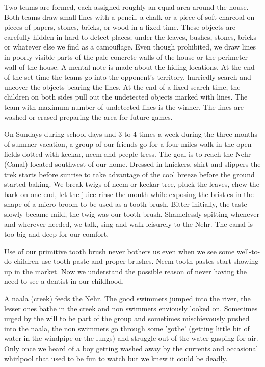 Two teams are formed, each assigned roughly an equal area around the
house. Both teams draw small lines with a pencil, a chalk or a piece of
soft charcoal on pieces of papers, stones, bricks, or wood in a fixed
time. These objects are carefully hidden in hard to detect places; under
the leaves, bushes, stones, bricks or whatever else we find as
a camouflage. Even though prohibited, we draw lines in poorly visible
parts of the pale concrete walls of the house or the perimeter wall of the
house.  A mental note is made about the hiding locations. At the end of
the set time the teams go into the opponent's territory, hurriedly search
and uncover the objects bearing the lines. At the end of a fixed search
time, the children on both sides pull out the undetected objects marked
with lines. The team with maximum number of undetected lines is the
winner. The lines are washed or erased preparing the area for future
games. 

On Sundays during school days and 3 to 4 times a week during the three
months of summer vacation, a group of our friends go for a four miles walk
in the open fields dotted with keekar, neem and peeple tress. The goal is
to reach the Nehr (Canal) located southwest of our home. Dressed in
knickers, shirt and slippers the trek starts before sunrise to take
advantage of the cool breeze before the ground started baking. We break
twigs of neem or keekar tree, pluck the leaves, chew the bark on one end,
let the juice rinse the mouth while exposing the bristles in the shape of
a micro broom to be used as a tooth brush. Bitter initially, the taste
slowly became mild, the twig was our tooth brush. Shamelessly spitting
whenever and wherever needed, we talk, sing and walk leisurely to the
Nehr. The canal is too big and deep for our comfort.

Use of our primitive tooth brush never bothers us even when we see some
well-to-do children use tooth paste and proper brushes. Neem tooth pastes
start showing up in the market. Now we understand the possible reason of
never having the need to see a dentist in our childhood. 

A naala (creek) feeds the Nehr. The good swimmers jumped into the river,
the lesser ones bathe in the creek and non swimmers enviously looked on.
Sometimes urged by the will to be part of the group and sometimes
mischievously pushed into the naala, the non swimmers go through some
'gothe'  (getting little bit of water in the windpipe or the lungs) and
struggle out of the water gasping for air. Only once we heard of a boy
getting washed away by the currents and occasional whirlpool that used to
be fun to watch but we knew it could be deadly. 

